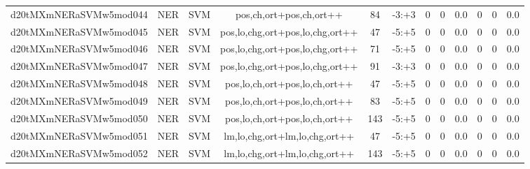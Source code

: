 \documentclass[a4paper]{article}
\begin{document}
\begin{landscape}
\begin{center}
\begin{tabular}{ |c|c|c|c|c|c|c|c|c|c|c|c|}
 
 	
 	\small{ d20tMXmNERaSVMw5mod044 } & \small{ NER} & \small{  SVM }  & pos,ch,ort+pos,ch,ort++  &  84 &  \small{  -3:+3 }  &  0 & 0 & 0.0  &  0 & 0 & 0.0 \\
 	

 
 	
 	\small{ d20tMXmNERaSVMw5mod045 } & \small{ NER} & \small{  SVM }  & pos,lo,chg,ort+pos,lo,chg,ort++  &  47 &  \small{  -5:+5 }  &  0 & 0 & 0.0  &  0 & 0 & 0.0 \\
 	

 
 	
 	\small{ d20tMXmNERaSVMw5mod046 } & \small{ NER} & \small{  SVM }  & pos,lo,chg,ort+pos,lo,chg,ort++  &  71 &  \small{  -5:+5 }  &  0 & 0 & 0.0  &  0 & 0 & 0.0 \\
 	

 
 	
 	\small{ d20tMXmNERaSVMw5mod047 } & \small{ NER} & \small{  SVM }  & pos,lo,chg,ort+pos,lo,chg,ort++  &  91 &  \small{  -3:+3 }  &  0 & 0 & 0.0  &  0 & 0 & 0.0 \\
 	

 
 	
 	\small{ d20tMXmNERaSVMw5mod048 } & \small{ NER} & \small{  SVM }  & pos,lo,ch,ort+pos,lo,ch,ort++  &  47 &  \small{  -5:+5 }  &  0 & 0 & 0.0  &  0 & 0 & 0.0 \\
 	

 
 	
 	\small{ d20tMXmNERaSVMw5mod049 } & \small{ NER} & \small{  SVM }  & pos,lo,ch,ort+pos,lo,ch,ort++  &  83 &  \small{  -5:+5 }  &  0 & 0 & 0.0  &  0 & 0 & 0.0 \\
 	

 
 	
 	\small{ d20tMXmNERaSVMw5mod050 } & \small{ NER} & \small{  SVM }  & pos,lo,ch,ort+pos,lo,ch,ort++  &  143 &  \small{  -5:+5 }  &  0 & 0 & 0.0  &  0 & 0 & 0.0 \\
 	

 
 	
 	\small{ d20tMXmNERaSVMw5mod051 } & \small{ NER} & \small{  SVM }  & lm,lo,chg,ort+lm,lo,chg,ort++  &  47 &  \small{  -5:+5 }  &  0 & 0 & 0.0  &  0 & 0 & 0.0 \\
 	

 
 	
 	\small{ d20tMXmNERaSVMw5mod052 } & \small{ NER} & \small{  SVM }  & lm,lo,chg,ort+lm,lo,chg,ort++  &  143 &  \small{  -5:+5 }  &  0 & 0 & 0.0  &  0 & 0 & 0.0 \\
 	


\end{tabular}
\end{center}
\end{landscape}
\end{document}
